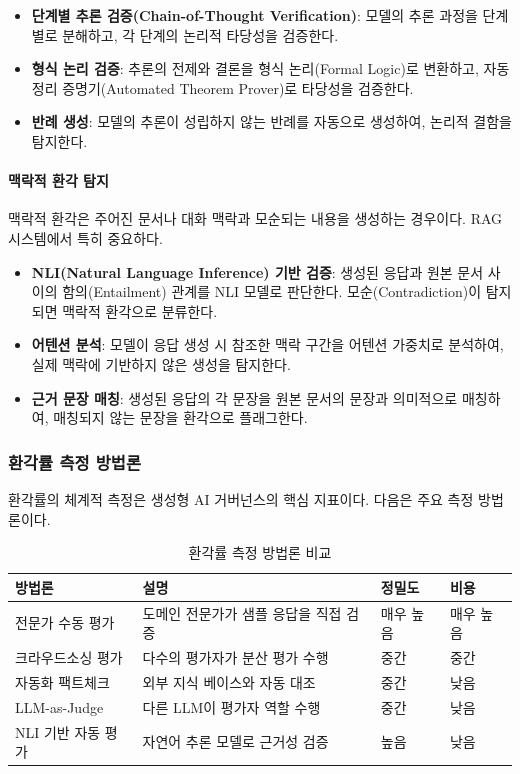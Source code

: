 \begin{itemize}
 \item \textbf{단계별 추론 검증(Chain-of-Thought Verification)}: 모델의 추론 과정을 단계별로 분해하고, 각 단계의 논리적 타당성을 검증한다.
 \item \textbf{형식 논리 검증}: 추론의 전제와 결론을 형식 논리(Formal Logic)로 변환하고, 자동 정리 증명기(Automated Theorem Prover)로 타당성을 검증한다.
 \item \textbf{반례 생성}: 모델의 추론이 성립하지 않는 반례를 자동으로 생성하여, 논리적 결함을 탐지한다.
\end{itemize}

\paragraph{맥락적 환각 탐지}
맥락적 환각은 주어진 문서나 대화 맥락과 모순되는 내용을 생성하는 경우이다. RAG\cite{lewis2020retrieval} 시스템에서 특히 중요하다.

\begin{itemize}
 \item \textbf{NLI(Natural Language Inference) 기반 검증}: 생성된 응답과 원본 문서 사이의 함의(Entailment) 관계를 NLI 모델로 판단한다. 모순(Contradiction)이 탐지되면 맥락적 환각으로 분류한다.
 \item \textbf{어텐션 분석}: 모델이 응답 생성 시 참조한 맥락 구간을 어텐션 가중치로 분석하여, 실제 맥락에 기반하지 않은 생성을 탐지한다.
 \item \textbf{근거 문장 매칭}: 생성된 응답의 각 문장을 원본 문서의 문장과 의미적으로 매칭하여, 매칭되지 않는 문장을 환각으로 플래그한다.
\end{itemize}

\subsubsection{환각률 측정 방법론}

환각률의 체계적 측정은 생성형 AI 거버넌스의 핵심 지표이다. 다음은 주요 측정 방법론이다.

\begin{table}[htbp]
\centering
\caption{환각률 측정 방법론 비교}
\label{tab:hallucination_methods}
\begin{tabularx}{\textwidth}{p{2.5cm}Xp{2cm}p{2cm}}
\toprule
\textbf{방법론} & \textbf{설명} & \textbf{정밀도} & \textbf{비용} \\
\midrule
전문가 수동 평가 & 도메인 전문가가 샘플 응답을 직접 검증 & 매우 높음 & 매우 높음 \\
크라우드소싱 평가 & 다수의 평가자가 분산 평가 수행 & 중간 & 중간 \\
자동화 팩트체크 & 외부 지식 베이스와 자동 대조 & 중간 & 낮음 \\
LLM-as-Judge\cite{brown2020language} & 다른 LLM이 평가자 역할 수행 & 중간 & 낮음 \\
NLI 기반 자동 평가 & 자연어 추론 모델로 근거성 검증 & 높음 & 낮음 \\
\bottomrule
\end{tabularx}
\end{table}

